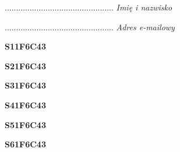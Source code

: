 \begin{turn}{90}\begin{minipage}{\linewidth} \vspace{20mm} ................................................  \textit{Imię i nazwisko}\end{minipage}\end{turn}

\begin{turn}{90}\begin{minipage}{\linewidth} \vspace{20mm} ................................................  \textit{Adres e-mailowy}\end{minipage}\end{turn}

\begin{turn}{90}\huge \begin{minipage}{\linewidth} \vspace{10mm}\textbf{S11F6C43}\end{minipage}\end{turn}

\begin{turn}{90}\huge \begin{minipage}{\linewidth} \vspace{10mm}\textbf{S21F6C43}\end{minipage}\end{turn}

\begin{turn}{90}\huge \begin{minipage}{\linewidth} \vspace{10mm}\textbf{S31F6C43}\end{minipage}\end{turn}

\begin{turn}{90}\huge \begin{minipage}{\linewidth} \vspace{10mm}\textbf{S41F6C43}\end{minipage}\end{turn}

\begin{turn}{90}\huge \begin{minipage}{\linewidth} \vspace{10mm}\textbf{S51F6C43}\end{minipage}\end{turn}

\begin{turn}{90}\huge \begin{minipage}{\linewidth} \vspace{10mm}\textbf{S61F6C43}\end{minipage}\end{turn}

